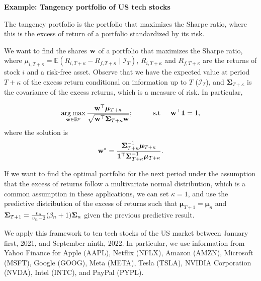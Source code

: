 \begin{enumerate}
\textbf{Example: Tangency portfolio of US tech stocks}

The tangency portfolio is the portfolio that maximizes the Sharpe ratio, where this is the excess of return of a portfolio standardized by its risk. 

We want to find the shares ${\bf w}$ of a portfolio that maximizes the Sharpe ratio, where $\mu_{i,T+\kappa}=\mathbb{E}(R_{i,T+\kappa}-R_{f,T+\kappa}\mid \mathcal{I}_T)$, $R_{i,T+\kappa}$ and $R_{f,T+\kappa}$ are the returns of stock $i$ and a risk-free asset. Observe that we have the expected value at period $T+\kappa$ of the excess return conditional on information up to $T$ ($\mathcal{I}_T$), and ${\bm{\Sigma}}_{T+\kappa}$ is the covariance of the excess returns, which is a measure of risk. In particular, 

\begin{equation*}
	\operatorname*{arg\,max}_{{\bf w}\in \mathbb{R}^{p}} \frac{{\bf w}^{\top}\bm{\mu}_{T+\kappa}}{\sqrt{{\bf w}^{\top}{\bm{\Sigma}}_{T+\kappa} {\bf w}}}; \hspace{1cm} \text{s.t}\hspace{.5cm} {\bf w}^{\top}{\bf{1}}=1,
\end{equation*}
where the solution is
\begin{equation*}
	{\bf w}^*=\frac{{\bm{\Sigma}}^{-1}_{T+\kappa}\bm{\mu}_{T+\kappa}}{{\bf{1}}^{\top}{\bf \Sigma}^{-1}_{T+\kappa}\bm{\mu}_{T+\kappa}}.
\end{equation*}

If we want to find the optimal portfolio for the next period under the assumption that the excess of returns follow a multivariate normal distribution, which is a common assumption in these applications, we can set $\kappa=1$, and use the predictive distribution of the excess of returns such that $\bm\mu_{T+1}=\bm\mu_n$ and ${\bm{\Sigma}}_{T+1}=\frac{v_n}{v_n-2}(\beta_n+1){\bf{\Sigma}}_n$ given the previous predictive result.

We apply this framework to ten tech stocks of the US market between January first, 2021, and September ninth, 2022. In particular, we use information from Yahoo Finance for Apple (AAPL), Netflix (NFLX), Amazon (AMZN), Microsoft (MSFT), Google (GOOG), Meta (META), Tesla (TSLA), NVIDIA Corporation (NVDA), Intel (INTC), and PayPal (PYPL).


\end{enumerate}
